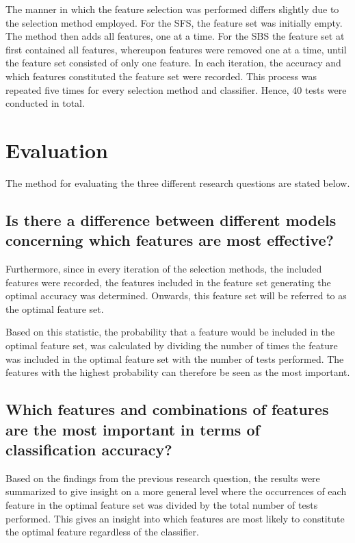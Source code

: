 \documentclass{kththesis}
\begin{document}
The manner in which the feature  selection was performed differs slightly due to the selection method employed. For the SFS, the feature set was initially empty. The method then adds all features, one at a time. For the SBS the feature set at first contained all features, whereupon features were removed one at a time, until the feature set consisted of only one feature. In each iteration, the accuracy and which features constituted the feature set were recorded. 
This process was repeated five times for every selection method and classifier. Hence, 40 tests were conducted in total.

\section{Evaluation}

The method for evaluating the three different research questions are stated below.

\subsection{Is there a difference between different models concerning which features are most effective?}
Furthermore, since in every iteration of the selection methods, the included features were recorded, the features included in the feature set generating the optimal accuracy was determined. Onwards, this feature set will be referred to as the optimal feature set. 

Based on this statistic, the probability that a feature would be included in the optimal feature set, was calculated by dividing the number of times the feature was included in the optimal feature set with the number of tests performed. The features with the highest probability can therefore be seen as the most important.

\subsection{Which features and combinations of features are the most important in terms of classification accuracy?}
Based on the findings from the previous research question, the results were summarized to give insight on a more general level where the occurrences of each feature in the optimal feature set was divided by the total number of tests performed. This gives an insight into which features are most likely to constitute the optimal feature regardless of the classifier.
\end{document}
